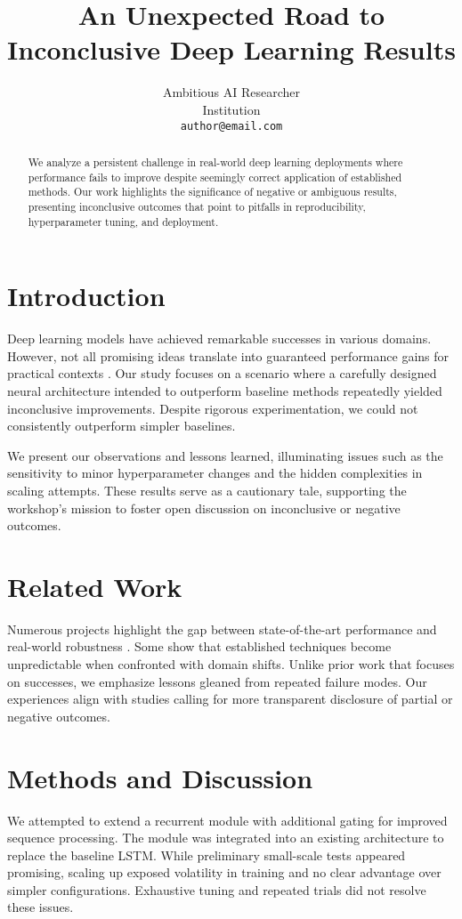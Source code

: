 \documentclass{article}
\title{\textbf{An Unexpected Road to\\Inconclusive Deep Learning Results}}
\author{
  Ambitious AI Researcher \\
  Institution \\
  \texttt{author@email.com}
}
\date{}
\begin{document}
\maketitle

\begin{abstract}
We analyze a persistent challenge in real-world deep learning deployments where performance fails to improve despite seemingly correct application of established methods. Our work highlights the significance of negative or ambiguous results, presenting inconclusive outcomes that point to pitfalls in reproducibility, hyperparameter tuning, and deployment.
\end{abstract}

\section{Introduction}
Deep learning models have achieved remarkable successes in various domains. However, not all promising ideas translate into guaranteed performance gains for practical contexts \citep{smith2020challenges}. Our study focuses on a scenario where a carefully designed neural architecture intended to outperform baseline methods repeatedly yielded inconclusive improvements. Despite rigorous experimentation, we could not consistently outperform simpler baselines.

We present our observations and lessons learned, illuminating issues such as the sensitivity to minor hyperparameter changes and the hidden complexities in scaling attempts. These results serve as a cautionary tale, supporting the workshop's mission to foster open discussion on inconclusive or negative outcomes.

\section{Related Work}
Numerous projects highlight the gap between state-of-the-art performance and real-world robustness \citep{lee2022traps}. Some show that established techniques become unpredictable when confronted with domain shifts. Unlike prior work that focuses on successes, we emphasize lessons gleaned from repeated failure modes. Our experiences align with studies calling for more transparent disclosure of partial or negative outcomes.

\section{Methods and Discussion}
We attempted to extend a recurrent module with additional gating for improved sequence processing. The module was integrated into an existing architecture to replace the baseline LSTM. While preliminary small-scale tests appeared promising, scaling up exposed volatility in training and no clear advantage over simpler configurations. Exhaustive tuning and repeated trials did not resolve these issues.
\end{document}
